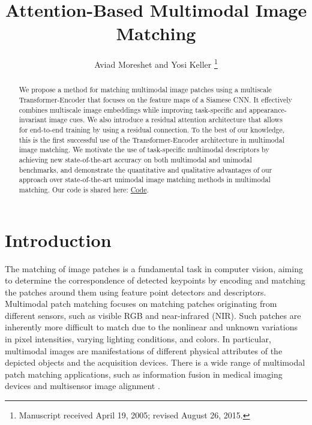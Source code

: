 \documentclass[10pt,journal]{IEEEtran}\usepackage{amsfonts}
\begin{document}
\thispagestyle{empty}



\title{Attention-Based Multimodal Image Matching}

\author{Aviad Moreshet and Yosi Keller
\thanks{Manuscript received April 19, 2005; revised August 26, 2015.}}

\maketitle

\begin{abstract}
We propose a method for matching multimodal image patches using a multiscale Transformer-Encoder
that focuses on the feature maps of a Siamese CNN. It effectively combines multiscale image embeddings while improving task-specific and appearance-invariant image cues. We also introduce a residual attention architecture that allows for end-to-end training by using a residual connection. To the best of our knowledge, this is the first successful use of the Transformer-Encoder architecture in multimodal image matching. We motivate the use of task-specific multimodal descriptors by achieving new state-of-the-art accuracy on both multimodal and unimodal benchmarks, and demonstrate the quantitative and qualitative advantages of our approach over state-of-the-art unimodal image matching methods in
multimodal matching. Our code is shared here: \href{https://github.com/CodeJjang/multiscale-attention-patch-matching}{Code}.
\end{abstract}










\section{Introduction}

The matching of image patches is a fundamental task in computer vision,
aiming to determine the correspondence of detected keypoints by encoding and
matching the patches around them using feature point detectors and
descriptors. Multimodal patch matching focuses on matching patches
originating from different sensors, such as visible RGB and near-infrared
(NIR). Such patches are inherently more difficult to match due to the
nonlinear and unknown variations in pixel intensities, varying lighting
conditions, and colors. In particular, multimodal images are manifestations
of different physical attributes of the depicted objects and the acquisition
devices. There is a wide range of multimodal patch matching applications,
such as information fusion in medical imaging devices \cite {MedicalImageRegistration} and multisensor image alignment \cite {MultiSensorAlignment}.
\end{document}
